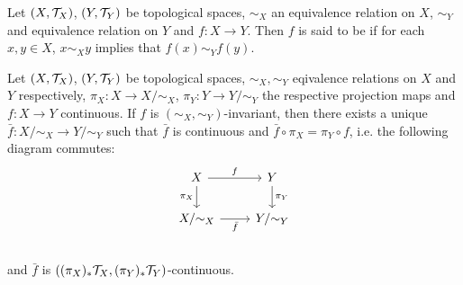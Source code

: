 \documentclass{book}
\begin{document}
	\begin{defn}
		Let $(X, \mathcal{T}_X)$, $(Y, \mathcal{T}_Y)$ be topological spaces, $\sim_X$ an equivalence relation on $X$, $\sim_Y$ and equivalence relation on $Y$ and $f : X \rightarrow Y $. Then $f$ is said to be  if for each $x, y \in X$, $x \sim_X y$ implies that $f(x) \sim_Y f(y)$.
	\end{defn}
	
	\begin{ex} 
	Let $(X, \mathcal{T}_X)$, $(Y, \mathcal{T}_Y)$ be topological spaces, $\sim_X, \sim_Y$ eqivalence relations on $X$ and $Y$ respectively, $\pi_X:X \rightarrow X/\sim_X$, $\pi_Y:Y \rightarrow Y/\sim_Y$ the respective projection maps and $f:X \rightarrow Y$ continuous. If $f$ is $(\sim_X, \sim_Y)$-invariant, then there exists a unique $\bar{f}:X / {\sim}_X \rightarrow Y/ {\sim_Y}$ such that $\bar{f}$ is continuous and $\bar{f} \circ \pi_X = \pi_Y \circ f$, i.e. the following diagram commutes:
	\[ 
	\begin{tikzcd}
		X  \arrow[r, "f"]  \arrow[d, "\pi_X"']  & Y   \arrow[d, "\pi_Y"]\\
		X/ {\sim_X} \arrow[r, "\bar{f}"'] &  Y / {\sim_Y} \\
	\end{tikzcd}
	\]
	and $\bar{f}$ is $((\pi_X)_*\mathcal{T}_X, (\pi_Y)_*\mathcal{T}_Y)$-continuous.
	\end{ex}
	
\end{document}
